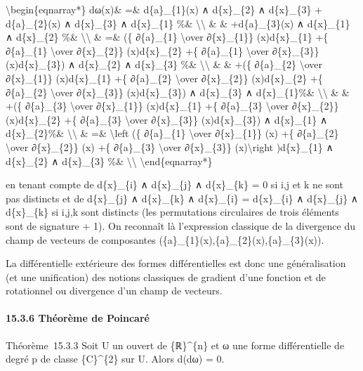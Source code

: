 \documentclass[]{article}
\begin{document}
\textbackslash{}begin\{eqnarray*\} dω(x)\& =\& d\{a\}\_\{1\}(x) ∧
d\{x\}\_\{2\} ∧ d\{x\}\_\{3\} + d\{a\}\_\{2\}(x) ∧ d\{x\}\_\{3\} ∧
d\{x\}\_\{1\} \%\& \textbackslash{}\textbackslash{} \& \&
+d\{a\}\_\{3\}(x) ∧ d\{x\}\_\{1\} ∧ d\{x\}\_\{2\} \%\&
\textbackslash{}\textbackslash{} \& =\& (\{ ∂\{a\}\_\{1\}
\textbackslash{}over ∂\{x\}\_\{1\}\} (x)d\{x\}\_\{1\} +\{ ∂\{a\}\_\{1\}
\textbackslash{}over ∂\{x\}\_\{2\}\} (x)d\{x\}\_\{2\} +\{ ∂\{a\}\_\{1\}
\textbackslash{}over ∂\{x\}\_\{3\}\} (x)d\{x\}\_\{3\}) ∧ d\{x\}\_\{2\} ∧
d\{x\}\_\{3\} \%\& \textbackslash{}\textbackslash{} \& \& +(\{
∂\{a\}\_\{2\} \textbackslash{}over ∂\{x\}\_\{1\}\} (x)d\{x\}\_\{1\} +\{
∂\{a\}\_\{2\} \textbackslash{}over ∂\{x\}\_\{2\}\} (x)d\{x\}\_\{2\} +\{
∂\{a\}\_\{2\} \textbackslash{}over ∂\{x\}\_\{3\}\} (x)d\{x\}\_\{3\}) ∧
d\{x\}\_\{3\} ∧ d\{x\}\_\{1\}\%\& \textbackslash{}\textbackslash{} \& \&
+(\{ ∂\{a\}\_\{3\} \textbackslash{}over ∂\{x\}\_\{1\}\} (x)d\{x\}\_\{1\}
+\{ ∂\{a\}\_\{3\} \textbackslash{}over ∂\{x\}\_\{2\}\} (x)d\{x\}\_\{2\}
+\{ ∂\{a\}\_\{3\} \textbackslash{}over ∂\{x\}\_\{3\}\} (x)d\{x\}\_\{3\})
∧ d\{x\}\_\{1\} ∧ d\{x\}\_\{2\}\%\& \textbackslash{}\textbackslash{} \&
=\& \textbackslash{}left (\{ ∂\{a\}\_\{1\} \textbackslash{}over
∂\{x\}\_\{1\}\} (x) +\{ ∂\{a\}\_\{2\} \textbackslash{}over
∂\{x\}\_\{2\}\} (x) +\{ ∂\{a\}\_\{3\} \textbackslash{}over
∂\{x\}\_\{3\}\} (x)\textbackslash{}right )d\{x\}\_\{1\} ∧ d\{x\}\_\{2\}
∧ d\{x\}\_\{3\} \%\& \textbackslash{}\textbackslash{}
\textbackslash{}end\{eqnarray*\}

en tenant compte de d\{x\}\_\{i\} ∧ d\{x\}\_\{j\} ∧ d\{x\}\_\{k\} = 0 si
i,j et k ne sont pas distincts et de d\{x\}\_\{j\} ∧ d\{x\}\_\{k\} ∧
d\{x\}\_\{i\} = d\{x\}\_\{i\} ∧ d\{x\}\_\{j\} ∧ d\{x\}\_\{k\} si i,j,k
sont distincts (les permutations circulaires de trois éléments sont de
signature + 1). On reconnaît là l'expression classique de la divergence
du champ de vecteurs de composantes
(\{a\}\_\{1\}(x),\{a\}\_\{2\}(x),\{a\}\_\{3\}(x)).

La différentielle extérieure des formes différentielles est donc une
généralisation (et une unification) des notions classiques de gradient
d'une fonction et de rotationnel ou divergence d'un champ de vecteurs.

\paragraph{15.3.6 Théorème de Poincaré}

Théorème~15.3.3 Soit U un ouvert de \{ℝ\}\^{}\{n\} et ω une forme
différentielle de degré p de classe \{C\}\^{}\{2\} sur U. Alors d(dω) =
0.
\end{document}

